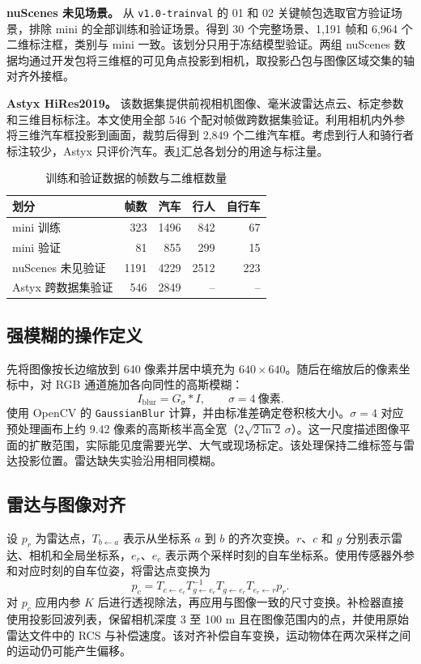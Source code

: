 \documentclass[conference,10pt,a4paper]{IEEEtran}
\begin{document}
\textbf{nuScenes 未见场景。} 从 \texttt{v1.0-trainval} 的 01 和 02 关键帧包选取官方验证场景，排除 mini 的全部训练和验证场景。得到 30 个完整场景、1,191 帧和 6,964 个二维标注框，类别与 mini 一致。该划分只用于冻结模型验证。两组 nuScenes 数据均通过开发包将三维框的可见角点投影到相机，取投影凸包与图像区域交集的轴对齐外接框。

\textbf{Astyx HiRes2019。} 该数据集提供前视相机图像、毫米波雷达点云、标定参数和三维目标标注\cite{astyx}。本文使用全部 546 个配对帧做跨数据集验证。利用相机内外参将三维汽车框投影到画面，裁剪后得到 2,849 个二维汽车框。考虑到行人和骑行者标注较少，Astyx 只评价汽车。表\ref{tab:data}汇总各划分的用途与标注量。

\begin{table}[!t]
\centering\small
\caption{训练和验证数据的帧数与二维框数量}\label{tab:data}
\setlength{\tabcolsep}{3pt}
\begin{tabular}{lrrrr}
\toprule
划分 & 帧数 & 汽车 & 行人 & 自行车 \\
\midrule
mini 训练 & 323 & 1496 & 842 & 67 \\
mini 验证 & 81 & 855 & 299 & 15 \\
nuScenes 未见验证 & 1191 & 4229 & 2512 & 223 \\
Astyx 跨数据集验证 & 546 & 2849 & -- & -- \\
\bottomrule
\end{tabular}
\end{table}

\subsection{强模糊的操作定义}
先将图像按长边缩放到 640 像素并居中填充为 $640\times640$。随后在缩放后的像素坐标中，对 RGB 通道施加各向同性的高斯模糊：
\begin{equation}
 I_{\mathrm{blur}} = G_{\sigma} * I, \qquad \sigma = 4\ \text{像素}.
 \label{eq:blur}
\end{equation}
使用 OpenCV 的 \texttt{GaussianBlur} 计算，并由标准差确定卷积核大小。$\sigma=4$ 对应预处理画布上约 9.42 像素的高斯核半高全宽（$2\sqrt{2\ln 2}\,\sigma$）。这一尺度描述图像平面的扩散范围，实际能见度需要光学、大气或现场标定。该处理保持二维标签与雷达投影位置。雷达缺失实验沿用相同模糊。

\subsection{雷达与图像对齐}
设 $p_r$ 为雷达点，$T_{b\leftarrow a}$ 表示从坐标系 $a$ 到 $b$ 的齐次变换。$r$、$c$ 和 $g$ 分别表示雷达、相机和全局坐标系，$e_r$、$e_c$ 表示两个采样时刻的自车坐标系。使用传感器外参和对应时刻的自车位姿，将雷达点变换为
\begin{equation}
 p_c=T_{c\leftarrow e_c}T_{g\leftarrow e_c}^{-1}
 T_{g\leftarrow e_r}T_{e_r\leftarrow r}p_r .
\end{equation}
对 $p_c$ 应用内参 $K$ 后进行透视除法，再应用与图像一致的尺寸变换。补检器直接使用投影回波列表，保留相机深度 3 至 100 m 且在图像范围内的点，并使用原始雷达文件中的 RCS 与补偿速度。该对齐补偿自车变换，运动物体在两次采样之间的运动仍可能产生偏移。
\end{document}
